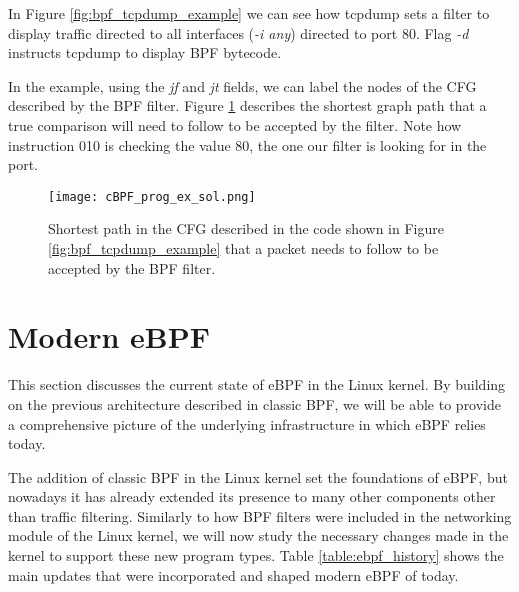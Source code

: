 In Figure \ref{fig:bpf_tcpdump_example} we can see how tcpdump sets a filter to display traffic directed to all interfaces (\textit{-i any}) directed to port 80. Flag \textit{-d} instructs tcpdump to display BPF bytecode.

In the example, using the \textit{jf} and \textit{jt} fields, we can label the nodes of the CFG described by the BPF filter. Figure \ref{fig:tcpdump_ex_sol} describes the shortest graph path that a true comparison will need to follow to be accepted by the filter. Note how instruction 010 is checking the value 80, the one our filter is looking for in the port.

\begin{figure}[htbp]
	\centering
	\texttt{[image: cBPF\_prog\_ex\_sol.png]}
	\caption{Shortest path in the CFG described in the code shown in Figure \ref{fig:bpf_tcpdump_example} that a packet needs to follow to be accepted by the BPF filter.}
	\label{fig:tcpdump_ex_sol}
\end{figure}

\section{Modern eBPF} \label{section:modern_ebpf}
This section discusses the current state of eBPF in the Linux kernel. By building on the previous architecture described in classic BPF, we will be able to provide a comprehensive picture of the underlying infrastructure in which eBPF relies today.

The addition of classic BPF in the Linux kernel set the foundations of eBPF, but nowadays it has already extended its presence to many other components other than traffic filtering. Similarly to how BPF filters were included in the networking module of the Linux kernel, we will now study the necessary changes made in the kernel to support these new program types. Table \ref{table:ebpf_history} shows the main updates that were incorporated and shaped modern eBPF of today.

